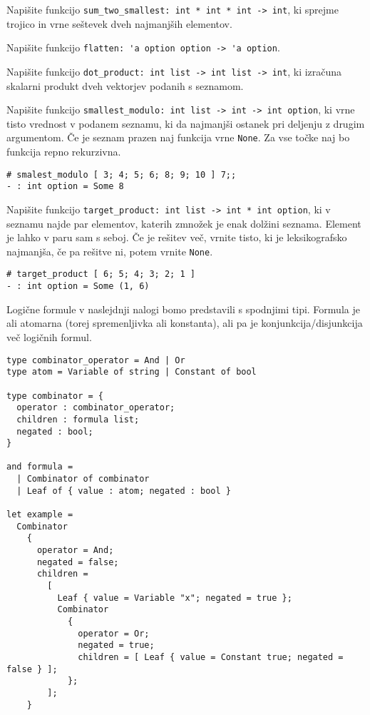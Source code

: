 \documentclass[arhiv]{../izpit}
\begin{document}


\naloga

\podnaloga
Napišite funkcijo \verb|sum_two_smallest: int * int * int -> int|, ki sprejme trojico in vrne seštevek dveh najmanjših elementov.

\podnaloga
Napišite funkcijo \verb|flatten: 'a option option -> 'a option|.

\podnaloga
Napišite funkcijo \verb|dot_product: int list -> int list -> int|, ki izračuna skalarni produkt dveh vektorjev podanih s seznamom.

\podnaloga
Napišite funkcijo \verb|smallest_modulo: int list -> int -> int option|, ki vrne tisto vrednost v podanem seznamu,
ki da najmanjši ostanek pri deljenju z drugim argumentom. Če je seznam prazen naj funkcija vrne \verb|None|.
Za vse točke naj bo funkcija repno rekurzivna.

\begin{verbatim}
# smalest_modulo [ 3; 4; 5; 6; 8; 9; 10 ] 7;;
- : int option = Some 8
\end{verbatim}

\podnaloga
Napišite funkcijo \verb|target_product: int list -> int * int option|, ki v seznamu najde par elementov, katerih zmnožek je enak dolžini seznama.
Element je lahko v paru sam s seboj. Če je rešitev več, vrnite tisto, ki je leksikografsko najmanjša, če pa rešitve ni, potem vrnite \verb|None|.

\begin{verbatim}
# target_product [ 6; 5; 4; 3; 2; 1 ]
- : int option = Some (1, 6)
\end{verbatim}


\naloga

Logične formule v naslejdnji nalogi bomo predstavili s spodnjimi tipi.
Formula je ali atomarna (torej spremenljivka ali konstanta), ali pa je konjunkcija/disjunkcija več logičnih formul.

\begin{verbatim}
type combinator_operator = And | Or
type atom = Variable of string | Constant of bool

type combinator = {
  operator : combinator_operator;
  children : formula list;
  negated : bool;
}

and formula =
  | Combinator of combinator
  | Leaf of { value : atom; negated : bool }

let example =
  Combinator
    {
      operator = And;
      negated = false;
      children =
        [
          Leaf { value = Variable "x"; negated = true };
          Combinator
            {
              operator = Or;
              negated = true;
              children = [ Leaf { value = Constant true; negated = false } ];
            };
        ];
    }
\end{verbatim}
\end{document}
